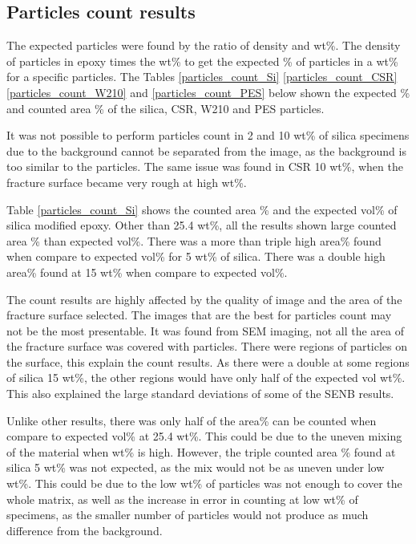 \documentclass[numbers=noendperiod,chapterprefix=on]{icldt} %
\begin{document}

\subsection{Particles count results}
The expected particles were found by the ratio of density and wt\%. The density of particles in epoxy times the wt\% to get the expected \% of particles in a wt\% for a specific particles. The Tables \ref{particles_count_Si}
\ref{particles_count_CSR}
\ref{particles_count_W210} and 
\ref{particles_count_PES}
below shown the expected \% and counted area \% of the silica, CSR, W210 and PES particles.

It was not possible to perform particles count in 2 and 10 wt\% of silica specimens due to the background cannot be separated from the image, as the background is too similar to the particles. The same issue was found in CSR 10 wt\%, when the fracture surface became very rough at high wt\%.

Table \ref{particles_count_Si} shows the counted area \% and the expected vol\% of silica modified epoxy. 
Other than 25.4 wt\%, all the results shown large counted area \% than expected vol\%. 
There was a more than triple high area\% found when compare to expected vol\% for 5 wt\% of silica. 
There was a double high area\% found at 15 wt\% when compare to expected vol\%.

The count results are highly affected by the quality of image and the area of the fracture surface selected. The images that are the best for particles count may not be the most presentable. It was found from SEM imaging, not all the area of the fracture surface was covered with particles. There were regions of particles on the surface, this explain the count results. As there were a double at some regions of silica 15 wt\%, the other regions would have only half of the expected vol wt\%. This also explained the large standard deviations of some of the SENB results. 

Unlike other results, there was only half of the area\% can be counted when compare to expected vol\% at 25.4 wt\%. This could be due to the uneven mixing of the material when wt\% is high.  
However, the triple counted area \% found at silica 5 wt\% was not expected, as the mix would not be as uneven under low wt\%. This could be due to the low wt\% of particles was not enough to cover the whole matrix, as well as the increase in error in counting at low wt\% of specimens, as the smaller number of particles would not produce as much difference from the background. 
\end{document}
